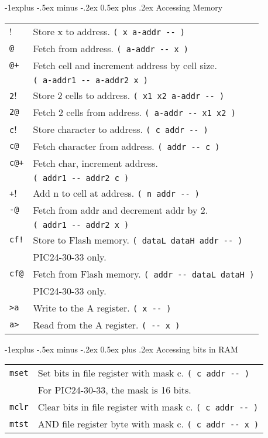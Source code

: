 \documentclass[10pt,landscape,a4paper]{article}
\makeatletter
\renewcommand{\subsection}{\@startsection{subsection}{2}{0mm}%
                                {-1explus -.5ex minus -.2ex}%
                                {0.5ex plus .2ex}%
                                {\normalfont\normalsize\bfseries}}
\makeatother
\begin{document}
\begin{multicols}{3}
\medskip

\subsection{Accessing Memory}
\begin{tabular}{@{}ll@{}}
\verb!!!  & Store x to address. \verb!( x a-addr -- )! \\
\verb!@!  & Fetch from address. \verb!( a-addr -- x )! \\
\verb!@+! & Fetch cell and increment address by cell size. \\
          & \verb!( a-addr1 -- a-addr2 x )!\\
\verb!2!! & Store 2 cells to address. \verb!( x1 x2 a-addr -- )! \\
\verb!2@! & Fetch 2 cells from address. \verb!( a-addr -- x1 x2 )! \\
\verb!c!! & Store character to address. \verb!( c addr -- )! \\
\verb!c@! & Fetch character from address. \verb!( addr -- c )! \\
\verb!c@+! & Fetch char, increment address. \\
           & \verb!( addr1 -- addr2 c )! \\
\verb!+!!  & Add n to cell at address. \verb!( n addr -- )! \\
\verb!-@!  & Fetch from addr and decrement addr by 2. \\
           & \verb!( addr1 -- addr2 x )! \\
\verb?cf!? & Store to Flash memory. \verb!( dataL dataH addr -- )! \\
           & PIC24-30-33 only. \\
\verb?cf@? & Fetch from Flash memory. \verb!( addr -- dataL dataH )! \\
           & PIC24-30-33 only. \\
\verb!>a!  & Write to the A register. \verb!( x -- )!\\
\verb!a>!  & Read from the A register. \verb!( -- x )!\\
\end{tabular}

\medskip

\subsection{Accessing bits in RAM}
\begin{tabular}{@{}ll@{}}
\verb!mset!  & Set bits in file register with mask c. \verb!( c addr -- )! \\
             & For PIC24-30-33, the mask is 16 bits. \\
\verb!mclr!  & Clear bits in file register with mask c. \verb!( c addr -- )! \\
\verb!mtst!  & AND file register byte with mask c. \verb!( c addr -- x )! \\
\end{tabular}\\


\end{multicols}
\end{document}

